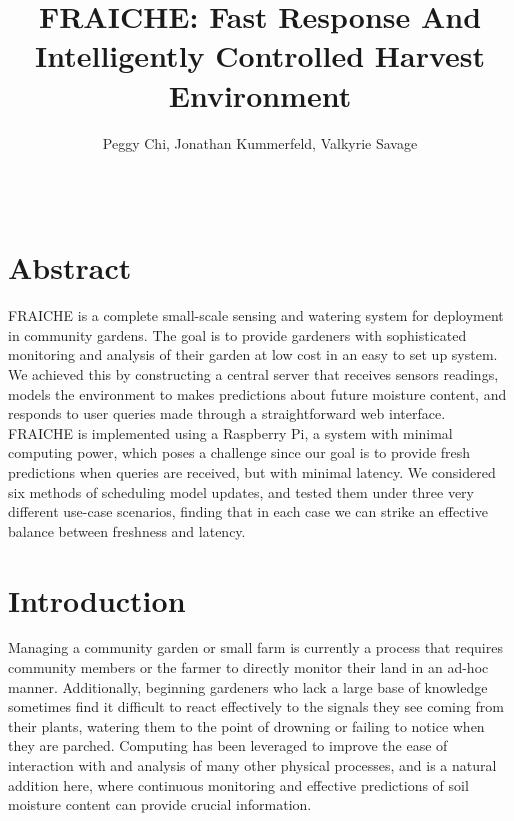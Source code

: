 \documentclass[a4paper]{acm_proc_article-sp}
\begin{document}
\title{FRAICHE: Fast Response And Intelligently Controlled Harvest Environment}
\author{\alignauthor Peggy Chi, Jonathan Kummerfeld, Valkyrie Savage \\
 \\
\\
} 
\maketitle

\setcounter{page}{1}

\section{Abstract}

FRAICHE is a complete small-scale sensing and watering system for deployment in community gardens.  The goal is to provide gardeners with sophisticated monitoring and analysis of their garden at low cost in an easy to set up system.  We achieved this by constructing a central server that receives sensors readings, models the environment to makes predictions about future moisture content, and responds to user queries made through a straightforward web interface.  FRAICHE is implemented using a Raspberry Pi, a system with minimal computing power, which poses a challenge since our goal is to provide fresh predictions when queries are received, but with minimal latency.  We considered six methods of scheduling model updates, and tested them under three very different use-case scenarios, finding that in each case we can strike an effective balance between freshness and latency.

\section{Introduction}

Managing a community garden or small farm is currently a process that requires community members or the farmer to directly monitor their land in an ad-hoc manner.  Additionally, beginning gardeners who lack a large base of knowledge sometimes find it difficult to react effectively to the signals they see coming from their plants, watering them to the point of drowning or failing to notice when they are parched.  Computing has been leveraged to improve the ease of interaction with and analysis of many other physical processes, and is a natural addition here, where continuous monitoring and effective predictions of soil moisture content can provide crucial information.
\end{document}
